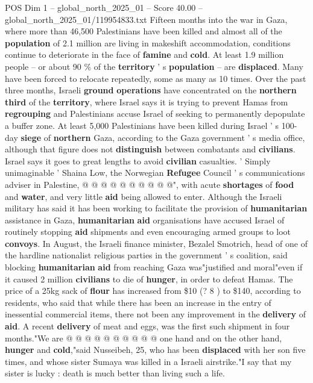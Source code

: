 \begin{textsample}{POS Dim 1 – global\_north\_2025\_01 – Score 40.00 – global\_north\_2025\_01/119954833.txt}  \label{ex:f1_pos_361}
Fifteen months into the war in Gaza, where more than 46,500 Palestinians have been killed and almost all of the \textbf{population} of 2.1 million are living in makeshift accommodation, conditions continue to deteriorate in the face of \textbf{famine} and \textbf{cold}.
At least 1.9 million people -- or about 90 \% of the \textbf{territory} ' s \textbf{population} -- are \textbf{displaced}.
Many have been forced to relocate repeatedly, some as many as 10 times.
Over the past three months, Israeli \textbf{ground} \textbf{operations} have concentrated on the \textbf{northern} \textbf{third} of the \textbf{territory}, where Israel says it is trying to prevent Hamas from \textbf{regrouping} and Palestinians accuse Israel of seeking to permanently depopulate a buffer zone.
At least 5,000 Palestinians have been killed during Israel ' s 100-day \textbf{siege} of \textbf{northern} Gaza, according to the Gaza government ' s media office, although that figure does not \textbf{distinguish} between combatants and \textbf{civilians}.
Israel says it goes to great lengths to avoid \textbf{civilian} casualties. ' Simply unimaginable ' Shaina Low, the Norwegian \textbf{Refugee} Council ' s communications adviser in Palestine, @ @ @ @ @ @ @ @ @ @", with acute \textbf{shortages} of \textbf{food} and \textbf{water}, and very little \textbf{aid} being allowed to enter.
Although the Israeli military has said it has been working to facilitate the provision of \textbf{humanitarian} assistance in Gaza, \textbf{humanitarian} \textbf{aid} organisations have accused Israel of routinely stopping \textbf{aid} shipments and even encouraging armed groups to loot \textbf{convoys}.
In August, the Israeli finance minister, Bezalel Smotrich, head of one of the hardline nationalist religious parties in the government ' s coalition, said blocking \textbf{humanitarian} \textbf{aid} from reaching Gaza was"justified and moral"even if it caused 2 million \textbf{civilians} to die of \textbf{hunger}, in order to defeat Hamas.
The price of a 25kg sack of \textbf{flour} has increased from \$10 (? 8 ) to \$140, according to residents, who said that while there has been an increase in the entry of inessential commercial items, there not been any improvement in the \textbf{delivery} of \textbf{aid}.
A recent \textbf{delivery} of meat and eggs, was the first such shipment in four months."We are @ @ @ @ @ @ @ @ @ @ one hand and on the other hand, \textbf{hunger} and \textbf{cold},"said Nusseibeh, 25, who has been \textbf{displaced} with her son five times, and whose sister Sumaya was killed in a Israeli airstrike."I say that my sister is lucky : death is much better than living such a life.

\end{textsample}
